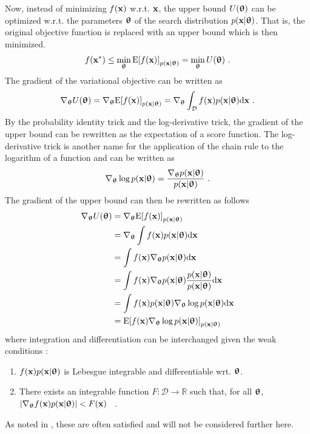 Now, instead of minimizing $f({\mathbf{x}})$ w.r.t. ${\mathbf{x}}$, the upper bound $U({{\boldsymbol{\uptheta}}})$ can be optimized w.r.t. the parameters ${{\boldsymbol{\uptheta}}}$ of the search distribution $p({\mathbf{x}}|{\boldsymbol{\uptheta}})$. That is, the original objective function is replaced with an upper bound which is then minimized.
\begin{equation}
    f(\x^*) \leq \min_\thetab \text{E}\bra{f(\x)}_{p(\x|\thetab)} = \min_\thetab U(\thetab) \ .
\end{equation}
The gradient of the variational objective can be written as
\begin{equation}
    \nabla_{\thetab} U({\thetab}) = \nabla_{\thetab} \text{E}\bra{f(\x)}_{p(\x|\thetab)} = \nabla_{\thetab}\int_\mathcal{D} f(\x)p(\x|{\thetab}) \text{d}\x \ .
\end{equation}
By the probability identity trick and the log-derivative trick, the gradient of the upper bound can be rewritten as the expectation of a score function. The log-derivative trick is another name for the application of the chain rule to the logarithm of a function and can be written as
\begin{equation}\label{eq: Theory: Log-derivative trick for pdf}
    \nabla_{{\boldsymbol{\uptheta}}} \log p({\mathbf{x}}|{{\boldsymbol{\uptheta}}}) = \frac{\nabla_{{\boldsymbol{\uptheta}}} p({\mathbf{x}}|{{\boldsymbol{\uptheta}}})}{p({\mathbf{x}}|{{\boldsymbol{\uptheta}}})} \ .
\end{equation}
The gradient of the upper bound can then be rewritten as follows
\begin{align}
\nabla_{{\boldsymbol{\uptheta}}} U({{\boldsymbol{\uptheta}}})
    &= \nabla_{{\boldsymbol{\uptheta}}}\text{E}{\left[f({\mathbf{x}})\right]}_{p({\mathbf{x}}|{{\boldsymbol{\uptheta}}})}\\
    &= \nabla_{{\boldsymbol{\uptheta}}}\int f({\mathbf{x}})p({\mathbf{x}}|{{\boldsymbol{\uptheta}}}) \text{d}{\mathbf{x}}\nonumber\\
    &= \int f({\mathbf{x}})\nabla_{{\boldsymbol{\uptheta}}} p({\mathbf{x}}|{{\boldsymbol{\uptheta}}}) \text{d}{\mathbf{x}}\nonumber\\
    &= \int f({\mathbf{x}})\nabla_{{\boldsymbol{\uptheta}}} p({\mathbf{x}}|{{\boldsymbol{\uptheta}}})\frac{p({\mathbf{x}}|{{\boldsymbol{\uptheta}}})}{p({\mathbf{x}}|{{\boldsymbol{\uptheta}}})} \text{d}{\mathbf{x}}\nonumber\\
    &= \int f({\mathbf{x}}) p({\mathbf{x}}|{{\boldsymbol{\uptheta}}})\nabla_{{\boldsymbol{\uptheta}}}\log p({\mathbf{x}}|{{\boldsymbol{\uptheta}}}) \text{d}{\mathbf{x}}\nonumber\\
    &= \text{E}{\left[f({\mathbf{x}})\nabla_{{\boldsymbol{\uptheta}}}\log p({\mathbf{x}}|{{\boldsymbol{\uptheta}}})\right]}_{p({\mathbf{x}}|{{\boldsymbol{\uptheta}}})}\label{eq: Theory: Variational optimization gradient estimator general search distribution}
\end{align}
where integration and differentiation can be interchanged given the weak conditions \cite{Staines2012}:
\begin{enumerate}
    \item $f({\mathbf{x}})p({\mathbf{x}}|{{\boldsymbol{\uptheta}}})$ is Lebesgue integrable and differentiable wrt. ${{\boldsymbol{\uptheta}}}$.
    \item There exists an integrable function $F: \mathcal{D}\rightarrow\mathbb{R}$ such that, for all ${{\boldsymbol{\uptheta}}}$, ${\left\lvert\nabla_{{\boldsymbol{\uptheta}}} f({\mathbf{x}})p({\mathbf{x}}|{\boldsymbol{\uptheta}})\right\rvert} < F({\mathbf{x}})$ \ .
\end{enumerate}
As noted in \cite{Staines2012}, these are often satisfied and will not be considered further here.

